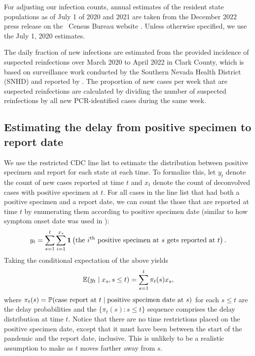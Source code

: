 \documentclass{article}
\begin{document}
For adjusting our infection counts, annual estimates of the resident state
populations as of July 1 of 2020 and 2021 are taken from the December
2022 press release on the \US\ Census Bureau website \citep{uscensus2022annual}.
Unless otherwise specified, we use the July 1, 2020 estimates.

The daily fraction of new infections are estimated from the provided incidence
of suspected reinfections over March 2020 to April 2022 in Clark County, which
is based on surveillance work conducted by the Southern Nevada Health District
(SNHD) and reported by \citet{ruff2022rapid}. The proportion of new cases per
week that are suspected reinfections are calculated by dividing the number of
suspected reinfections by all new PCR-identified cases during the same week. 


\subsection{Estimating the delay from positive specimen to report date} 

We use the restricted CDC line list to estimate the distribution between positive specimen
 and report for each state at each time. To formalize this, let
$y_t$ denote the count of new cases reported at time $t$ and $x_t$ denote the
count of deconvolved cases with positive specimen at $t$. 
For all cases in the line list that had both a positive specimen and a report date, 
we can count the those that are
reported at time $t$ by enumerating them according to positive specimen date 
(similar to how symptom onset date was used in \citealp{jahja2022real}):
\begin{align*}
y_t = \sum_{s=1}^{t} \sum_{i=1}^{x_s}\indicator \left ( \text{the }i\th\text{ positive specimen at }
 s \text{ gets reported at }t \right ).
\end{align*}
Taking the conditional expectation of the above yields
\begin{align*}
\E(y_t \mid x_s, s \leq t) = \sum_{s=1}^{t} \pi_t(s) x_s ,
\end{align*}
where $\pi_t(s) = \P(\text{case report at }t \mid \text{positive specimen date at }s)$ for
each $s \leq t$ are the delay probabilities and the $\{ \pi_t(s) : s \leq t
\}$ sequence comprises the delay distribution at time $t$. Notice that
there are no time restrictions placed on the positive specimen date, except that it must
have been between the start of the pandemic and the report date, inclusive. This is
unlikely to be a realistic assumption to make as $t$ moves farther away from
$s$. 
\end{document}
